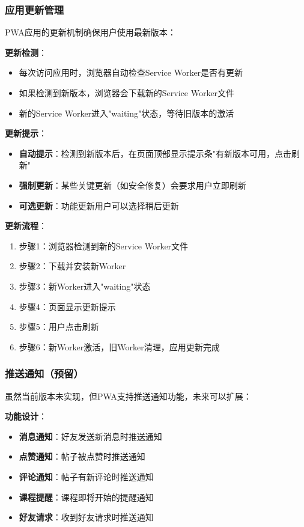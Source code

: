 \documentclass[12pt,a4paper]{article}
\begin{document}
\subsubsection{应用更新管理}

PWA应用的更新机制确保用户使用最新版本：

\textbf{更新检测}：
\begin{itemize}
    \item 每次访问应用时，浏览器自动检查Service Worker是否有更新
    \item 如果检测到新版本，浏览器会下载新的Service Worker文件
    \item 新的Service Worker进入"waiting"状态，等待旧版本的激活
\end{itemize}

\textbf{更新提示}：
\begin{itemize}
    \item \textbf{自动提示}：检测到新版本后，在页面顶部显示提示条"有新版本可用，点击刷新"
    \item \textbf{强制更新}：某些关键更新（如安全修复）会要求用户立即刷新
    \item \textbf{可选更新}：功能更新用户可以选择稍后更新
\end{itemize}

\textbf{更新流程}：
\begin{enumerate}
    \item 步骤1：浏览器检测到新的Service Worker文件
    \item 步骤2：下载并安装新Worker
    \item 步骤3：新Worker进入"waiting"状态
    \item 步骤4：页面显示更新提示
    \item 步骤5：用户点击刷新
    \item 步骤6：新Worker激活，旧Worker清理，应用更新完成
\end{enumerate}

\subsubsection{推送通知（预留）}

虽然当前版本未实现，但PWA支持推送通知功能，未来可以扩展：

\textbf{功能设计}：
\begin{itemize}
    \item \textbf{消息通知}：好友发送新消息时推送通知
    \item \textbf{点赞通知}：帖子被点赞时推送通知
    \item \textbf{评论通知}：帖子有新评论时推送通知
    \item \textbf{课程提醒}：课程即将开始的提醒通知
    \item \textbf{好友请求}：收到好友请求时推送通知
\end{itemize}
\end{document}
